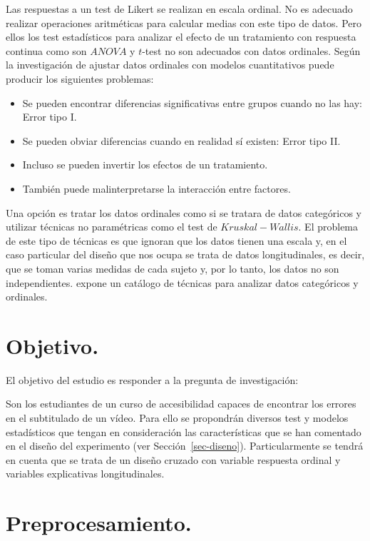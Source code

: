 \documentclass[
  12pt,
  a4paper,
  extrafontsizes,
  onecolumn,
  openright]{memoir}
\providecommand{\tightlist}{%
  \setlength{\itemsep}{0pt}\setlength{\parskip}{0pt}}\usepackage{longtable,booktabs,array}
\begin{document}
Las respuestas a un test de Likert se realizan en escala ordinal. No es
adecuado realizar operaciones aritméticas para calcular medias con este
tipo de datos. Pero ellos los test estadísticos para analizar el efecto
de un tratamiento con respuesta continua como son \(ANOVA\) y \(t\)-test
no son adecuados con datos ordinales. Según la investigación de
\textcite{kruschke20182018328} ajustar datos ordinales con modelos
cuantitativos puede producir los siguientes problemas:

\begin{itemize}
\tightlist
\item
  Se pueden encontrar diferencias significativas entre grupos cuando no
  las hay: Error tipo I.
\item
  Se pueden obviar diferencias cuando en realidad sí existen: Error tipo
  II.
\item
  Incluso se pueden invertir los efectos de un tratamiento.
\item
  También puede malinterpretarse la interacción entre factores.
\end{itemize}

Una opción es tratar los datos ordinales como si se tratara de datos
categóricos y utilizar técnicas no paramétricas como el test de
\(Kruskal-Wallis\). El problema de este tipo de técnicas es que ignoran
que los datos tienen una escala y, en el caso particular del diseño que
nos ocupa se trata de datos longitudinales, es decir, que se toman
varias medidas de cada sujeto y, por lo tanto, los datos no son
independientes. \textcite{agresti2010} expone un catálogo de técnicas
para analizar datos categóricos y ordinales.

\hypertarget{objetivo.}{%
\section{Objetivo.}\label{objetivo.}}

El objetivo del estudio es responder a la pregunta de investigación:

Son los estudiantes de un curso de accesibilidad capaces de encontrar
los errores en el subtitulado de un vídeo. Para ello se propondrán
diversos test y modelos estadísticos que tengan en consideración las
características que se han comentado en el diseño del experimento (ver
Sección~\ref{sec-diseno}). Particularmente se tendrá en cuenta que se
trata de un diseño cruzado con variable respuesta ordinal y variables
explicativas longitudinales.

\hypertarget{sec-preprocesado}{%
\section{Preprocesamiento.}\label{sec-preprocesado}}
\end{document}
